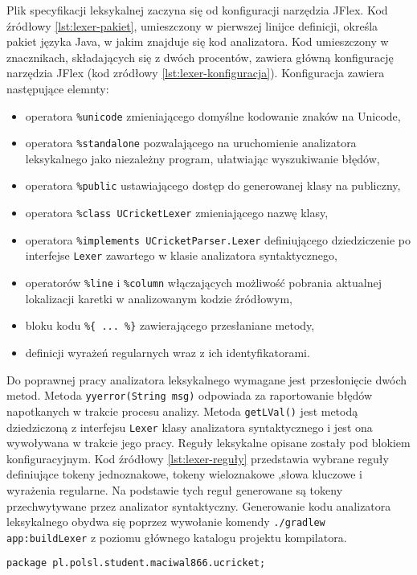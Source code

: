Plik specyfikacji leksykalnej zaczyna się od konfiguracji narzędzia JFlex. Kod źródłowy \ref{lst:lexer-pakiet}, umieszczony w pierwszej linijce definicji, określa pakiet języka Java, w jakim znajduje się kod analizatora.
Kod umieszczony w znacznikach, składających się z dwóch procentów, zawiera główną konfigurację narzędzia JFlex (kod zródłowy \ref{lst:lexer-konfiguracja}). Konfiguracja zawiera następujące elemnty:
\begin{itemize}
\item operatora \lstinline|%unicode| zmieniającego domyślne kodowanie znaków na Unicode,
\item operatora \lstinline|%standalone| pozwalającego na uruchomienie analizatora leksykalnego jako niezależny program, ułatwiając wyszukiwanie błędów,
\item operatora \lstinline|%public| ustawiającego dostęp do generowanej klasy na publiczny,
\item operatora \lstinline|%class UCricketLexer| zmieniającego nazwę klasy,
\item operatora \lstinline|%implements UCricketParser.Lexer| definiującego dziedziczenie po interfejse \lstinline|Lexer| zawartego w klasie analizatora syntaktycznego,
\item operatorów \lstinline|%line| i \lstinline|%column| włączających możliwość pobrania aktualnej lokalizacji karetki w analizowanym kodzie źródłowym,
\item bloku kodu \lstinline|%{ ... %}| zawierającego przesłaniane metody,
\item definicji wyrażeń regularnych wraz z ich identyfikatorami.
\end{itemize}
Do poprawnej pracy analizatora leksykalnego wymagane jest przesłonięcie dwóch metod. Metoda \lstinline|yyerror(String msg)| odpowiada za raportowanie błędów napotkanych w trakcie procesu analizy. Metoda \lstinline|getLVal()| jest metodą dziedziczoną z interfejsu \lstinline|Lexer| klasy analizatora syntaktycznego i jest ona wywoływana w trakcie jego pracy.
Reguły leksykalne opisane zostały pod blokiem konfiguracyjnym. Kod źródłowy \ref{lst:lexer-reguły} przedstawia wybrane reguły definiujące tokeny jednoznakowe, tokeny wieloznakowe ,słowa kluczowe i wyrażenia regularne. Na podstawie tych reguł generowane są tokeny przechwytywane przez analizator syntaktyczny.
Generowanie kodu analizatora leksykalnego obydwa się poprzez wywołanie komendy \lstinline|./gradlew app:buildLexer| z poziomu głównego katalogu projektu kompilatora.

\begin{lstlisting}[caption={Definicja pakietu dla analizatora leksykalnego}, label={lst:lexer-pakiet}]
package pl.polsl.student.maciwal866.ucricket;
\end{lstlisting}

